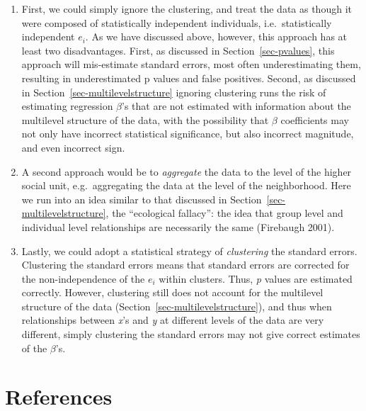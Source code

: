\documentclass[
  letterpaper,
  DIV=11,
  numbers=noendperiod]{scrreprt}
\providecommand{\tightlist}{%
  \setlength{\itemsep}{0pt}\setlength{\parskip}{0pt}}\usepackage{longtable,booktabs,array}
\begin{document}
\begin{enumerate}
\def\labelenumi{\arabic{enumi}.}
\tightlist
\item
  First, we could simply ignore the clustering, and treat the data as
  though it were composed of statistically independent individuals,
  i.e.~statistically independent \(e_i\). As we have discussed above,
  however, this approach has at least two disadvantages. First, as
  discussed in Section~\ref{sec-pvalues}, this approach will
  mis-estimate standard errors, most often underestimating them,
  resulting in underestimated p values and false positives. Second, as
  discussed in Section~\ref{sec-multilevelstructure} ignoring clustering
  runs the risk of estimating regression \(\beta\)'s that are not
  estimated with information about the multilevel structure of the data,
  with the possibility that \(\beta\) coefficients may not only have
  incorrect statistical significance, but also incorrect magnitude, and
  even incorrect sign.
\item
  A second approach would be to \emph{aggregate} the data to the level
  of the higher social unit, e.g.~aggregating the data at the level of
  the neighborhood. Here we run into an idea similar to that discussed
  in Section~\ref{sec-multilevelstructure}, the ``ecological fallacy'':
  the idea that group level and individual level relationships are
  necessarily the same (Firebaugh 2001).
\item
  Lastly, we could adopt a statistical strategy of \emph{clustering} the
  standard errors. Clustering the standard errors means that standard
  errors are corrected for the non-independence of the \(e_i\) within
  clusters. Thus, \emph{p} values are estimated correctly. However,
  clustering still does not account for the multilevel structure of the
  data (Section~\ref{sec-multilevelstructure}), and thus when
  relationships between \emph{x}'s and \emph{y} at different levels of
  the data are very different, simply clustering the standard errors may
  not give correct estimates of the \(\beta\)'s.
\end{enumerate}


\hypertarget{references}{%
\chapter*{References}\label{references}}

\end{document}
